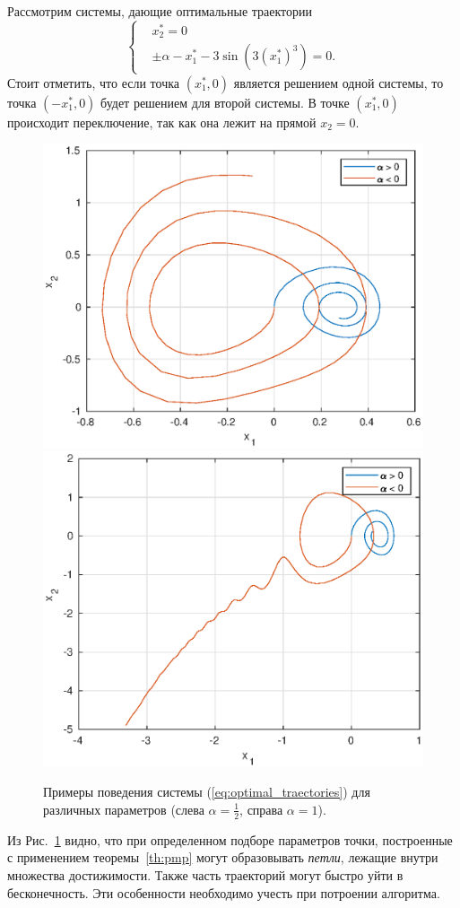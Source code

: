 Рассмотрим системы, дающие оптимальные траектории
\begin{equation}\label{eq:optimal_traectories}
        \left\{
        \begin{aligned}
                & x_2^* = 0 \\
                & \pm \alpha - x_1^* - 3 \sin(3(x_1^*)^3) = 0.
        \end{aligned}
        \right.
\end{equation}
Стоит отметить, что если точка $(x_1^*, 0)$ является решением одной системы, то точка $(-x_1^*, 0)$ будет решением для второй системы. В точке $(x_1^*, 0)$ происходит переключение, так как она лежит на прямой $x_2 = 0$.
\begin{figure}[h]
        \centering
        \includegraphics[width=0.49\linewidth]{research_of_the_system/fixed_points/a0-5t10.eps}
        \includegraphics[width=0.49\linewidth]{research_of_the_system/fixed_points/a1t6.eps}
        \caption{Примеры поведения системы (\ref{eq:optimal_traectories}) для различных параметров (слева $\alpha = \frac{1}{2}$, справа $\alpha = 1$).}
        \label{img:fixed_points}
\end{figure}

Из Рис.~\ref{img:fixed_points} видно, что при определенном подборе параметров точки, построенные с применением теоремы~\ref{th:pmp} могут образовывать \textit{петли}, лежащие внутри множества достижимости. Также часть траекторий могут быстро уйти в бесконечность. Эти особенности необходимо учесть при потроении алгоритма.

